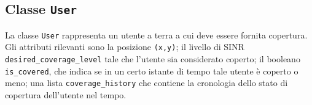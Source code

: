 \subsection{Classe \texttt{User}} \label{subsec:user}

La classe \texttt{User} rappresenta un utente a terra a cui deve essere fornita copertura.
Gli attributi rilevanti sono la posizione \texttt{(x,y)}; il livello di SINR \texttt{desired\_coverage\_level} tale che l'utente sia considerato coperto; il booleano \texttt{is\_covered}, che indica se in un certo istante di tempo tale utente è coperto o meno; una lista \texttt{coverage\_history} che contiene la cronologia dello stato di copertura dell'utente nel tempo.